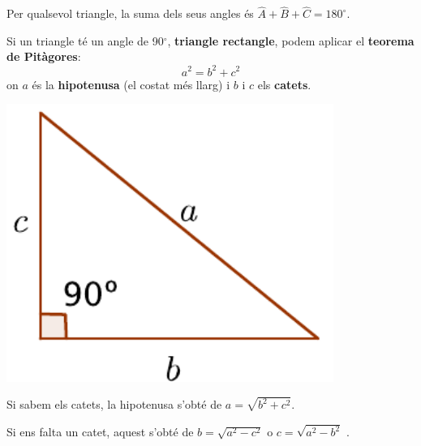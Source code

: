 \begin{theorybox}
	Per qualsevol triangle, la suma dels seus angles és $\hat A + \hat B+ \hat C = 180^\circ$.
	
	\begin{minipage}{0.6\textwidth}
		Si un triangle té un angle de 90$^\circ$, \textbf{triangle rectangle}, podem aplicar el \textbf{teorema de Pitàgores}:
		\[a^2 = b^2 + c^2 \]
		on $a$ és la \textbf{hipotenusa} (el costat més llarg) i $b$ i $c$ els \textbf{catets}.
	\end{minipage}
\begin{minipage}{0.4\textwidth}
	\centering
	\includegraphics[width=0.8\textwidth]{img-09/pitagores}
\end{minipage}

Si sabem els catets, la hipotenusa s'obté de  $a=\sqrt{b^2+c^2}$.

Si ens falta un catet, aquest s'obté de $b=\sqrt{a^2-c^2}$  o $c=\sqrt{a^2-b^2}$ .
\end{theorybox}
 

